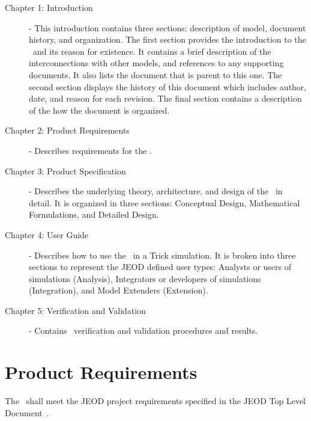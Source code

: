 \begin{description}

\item[Chapter 1: Introduction] - 
This introduction contains three sections: description of model, document history, and organization.  
The first section provides the introduction to the \mathDesc\ and its reason 
for existence.  It contains a brief description of the interconnections with other models, and 
references to any supporting documents. It also lists the document that is parent to this one.
The second section displays the history of this document which includes
author, date, and reason for each revision.  The final
section contains a description of the how the document is organized.

\item[Chapter 2: Product Requirements] - 
Describes requirements for the \mathDesc.

\item[Chapter 3: Product Specification] - 
Describes the underlying theory, architecture, and design of the \mathDesc\ in detail.  It is organized in 
three sections: Conceptual Design, Mathematical Formulations, and Detailed Design.

\item[Chapter 4: User Guide] - 
Describes how to use the \mathDesc\ in a Trick simulation.  It is broken into three sections to represent the JEOD 
defined user types: Analysts or users of simulations (Analysis), Integrators or developers of simulations (Integration),
and Model Extenders (Extension).

\item[Chapter 5: Verification and Validation] -  
Contains \mathDesc\ verification and validation procedures and results.

\end{description}

\chapter{Product Requirements}\label{ch:reqt}
The \mathDesc\ shall meet the JEOD project requirements specified in the 
JEOD Top Level Document~\cite{dynenv:JEOD}.

